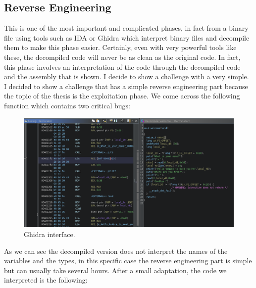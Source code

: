     \subsection{Reverse Engineering}
    This is one of the most important and complicated phases, in fact from a binary file using tools such as IDA or Ghidra which interpret binary files and decompile them to make this phase easier.\newline
    Certainly, even with very powerful tools like these, the decompiled code will never be as clean as the original code.\newline
    In fact, this phase involves an interpretation of the code through the decompiled code and the assembly that is shown.
    I decide to show a challenge with a very simple.
    I decided to show a challenge that has a simple reverse engineering part because the topic of the thesis is the exploitation phase.\newline
    We come across the following function which contains two critical bugs:\newline
    \clearpage
    \begin{figure}[htbp]
        \centering
        \includegraphics[width=0.9\linewidth]{Images/terminator_rev.png}
        \caption{Ghidra interface.}
        \label{fig:enter-label}
    \end{figure}
    As we can see the decompiled version does not interpret the names of the variables and the types, in this specific case the reverse engineering part is simple but can usually take several hours.\newline
    After a small adaptation, the code we interpreted is the following:\newline

